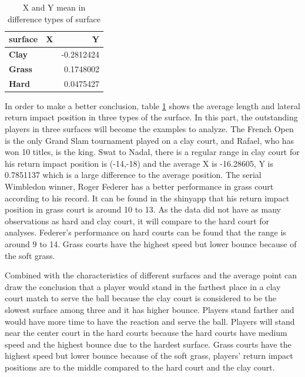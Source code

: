 \documentclass[11pt,a4paper,]{article}
\begin{document}
\begin{table}

\caption{\label{tab:meantab}X and Y mean in difference types of surface}
\centering
\begin{tabular}[t]{>{}l||>{\raggedleft\arraybackslash}p{10em}|r}
\hline
surface & X & Y\\
\hline
\textbf{Clay} & \cellcolor{white}{-14.07975} & -0.2812424\\
\hline
\textbf{Grass} & \cellcolor{white}{-12.89163} & 0.1748002\\
\hline
\textbf{Hard} & \cellcolor{white}{-12.82446} & 0.0475427\\
\hline
\end{tabular}
\end{table}

In order to make a better conclusion, table \ref{tab:meantab} shows the average length and lateral return impact position in three types of the surface. In this part, the outstanding players in three surfaces will become the examples to analyze.
The French Open is the only Grand Slam tournament played on a clay court, and Rafael, who has won 10 titles, is the king\autocite{kilit}. Swat to Nadal, there is a regular range in clay court for his return impact position is (-14,-18) and the average X is -16.28605, Y is 0.7851137 which is a large difference to the average position. The serial Wimbledon winner, Roger Federer has a better performance in grass court according to his record. It can be found in the shinyapp that his return impact position in grass court is around 10 to 13. As the data did not have as many observations as hard and clay court, it will compare to the hard court for analyses. Federer's performance on hard courts can be found that the range is around 9 to 14. Grass courts have the highest speed but lower bounce because of the soft grass.

Combined with the characteristics of different surfaces and the average point can draw the conclusion that a player would stand in the farthest place in a clay court match to serve the ball because the clay court is considered to be the slowest surface among three and it has higher bounce. Players stand farther and would have more time to have the reaction and serve the ball. Players will stand near the center court in the hard courts because the hard courts have medium speed and the highest bounce due to the hardest surface. Grass courts have the highest speed but lower bounce because of the soft grass, players' return impact positions are to the middle compared to the hard court and the clay court.
\end{document}
